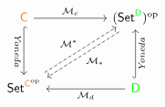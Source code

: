 

\color{ink}
$\begin{tikzcd}
\C \arrow[dd, "\mathit{Yoneda}" {anchor=north, rotate=270}, hook] \arrow[rr, "\M_c"] && (\mathsf{Set}^{\D})^{\op} \arrow[lldd, dashed, "\M_*", shift left=.5ex] \\
\\
\mathsf{Set}^{\C^{\op}} \arrow[rruu, dashed, "\M^*", shift left=.5ex] && \D \arrow[ll, "\M_d"] \arrow[uu, "\mathit{Yoneda}" {anchor=north, rotate=90}, hook]
\end{tikzcd}$

